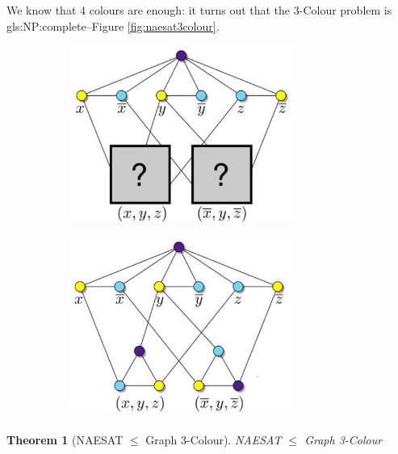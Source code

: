 \documentclass[]{article}
\newtheorem{thm}{Theorem}
\begin{document}
We know that 4 colours are enough: it turns out that the 3-Colour problem is \gls{gls:NP:complete}--Figure \ref{fig:naesat3colour}.
\begin{figure}[H]
	\caption[NAESAT $\le$ Graph 3-Colour]{NAESAT $\le$ Graph 3-Colour: each node is a country, and each border an edge; two nodes are connected \emph{iff} the two countries share a border.}\label{fig:naesat3colour}
	\begin{subfigure}[t]{0.45\textwidth}
		\includegraphics[width=0.8\textwidth]{naesat3colour}
	\end{subfigure}
	\begin{subfigure}[t]{0.45\textwidth}
		\includegraphics[width=0.8\textwidth]{naesat3solution}
	\end{subfigure}
\end{figure}

\begin{thm}[NAESAT $\le$ Graph 3-Colour]
	NAESAT $\le$ Graph 3-Colour
\end{thm}
\end{document}
